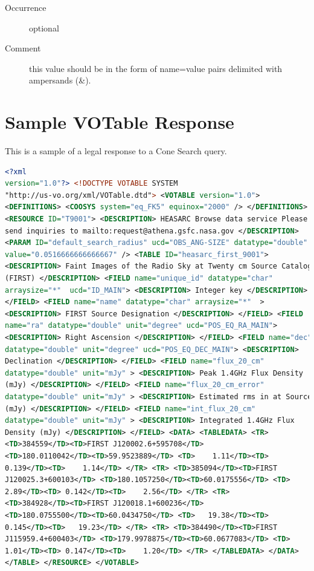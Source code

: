 \documentclass[11pt,a4paper]{ivoa} 
\begin{document}
\begin{generated}
\begin{bigdescription}
\begin{description}
\item[Occurrence] optional \item[Comment] this value should be in the
form of name=value pairs delimited with ampersands (\&).  
               

\end{description}


\end{bigdescription}\endgroup

\endgroup \end{generated}


\appendix \section{Sample VOTable Response} \label{app:responsesample}
This is a sample of a legal response to a Cone Search query.

\begin{lstlisting}[language=XML,basicstyle=\footnotesize] <?xml
version="1.0"?> <!DOCTYPE VOTABLE SYSTEM
"http://us-vo.org/xml/VOTable.dtd"> <VOTABLE version="1.0">
<DEFINITIONS> <COOSYS system="eq_FK5" equinox="2000" /> </DEFINITIONS>
<RESOURCE ID="T9001"> <DESCRIPTION> HEASARC Browse data service Please
send inquiries to mailto:request@athena.gsfc.nasa.gov </DESCRIPTION>
<PARAM ID="default_search_radius" ucd="OBS_ANG-SIZE" datatype="double"
value="0.0516666666666667" /> <TABLE ID="heasarc_first_9001">
<DESCRIPTION> Faint Images of the Radio Sky at Twenty cm Source Catalog
(FIRST) </DESCRIPTION> <FIELD name="unique_id" datatype="char"
arraysize="*"  ucd="ID_MAIN"> <DESCRIPTION> Integer key </DESCRIPTION>
</FIELD> <FIELD name="name" datatype="char" arraysize="*"  >
<DESCRIPTION> FIRST Source Designation </DESCRIPTION> </FIELD> <FIELD
name="ra" datatype="double" unit="degree" ucd="POS_EQ_RA_MAIN">
<DESCRIPTION> Right Ascension </DESCRIPTION> </FIELD> <FIELD name="dec"
datatype="double" unit="degree" ucd="POS_EQ_DEC_MAIN"> <DESCRIPTION>
Declination </DESCRIPTION> </FIELD> <FIELD name="flux_20_cm"
datatype="double" unit="mJy" > <DESCRIPTION> Peak 1.4GHz Flux Density
(mJy) </DESCRIPTION> </FIELD> <FIELD name="flux_20_cm_error"
datatype="double" unit="mJy" > <DESCRIPTION> Estimated rms in at Source
(mJy) </DESCRIPTION> </FIELD> <FIELD name="int_flux_20_cm"
datatype="double" unit="mJy" > <DESCRIPTION> Integrated 1.4GHz Flux
Density (mJy) </DESCRIPTION> </FIELD> <DATA> <TABLEDATA> <TR>
<TD>384559</TD><TD>FIRST J120002.6+595708</TD>
<TD>180.0110042</TD><TD>59.9523889</TD> <TD>    1.11</TD><TD>
0.139</TD><TD>    1.14</TD> </TR> <TR> <TD>385094</TD><TD>FIRST
J120025.3+600103</TD> <TD>180.1057250</TD><TD>60.0175556</TD> <TD>
2.89</TD><TD> 0.142</TD><TD>    2.56</TD> </TR> <TR>
<TD>384928</TD><TD>FIRST J120018.1+600236</TD>
<TD>180.0755500</TD><TD>60.0434750</TD> <TD>   19.38</TD><TD>
0.145</TD><TD>   19.23</TD> </TR> <TR> <TD>384490</TD><TD>FIRST
J115959.4+600403</TD> <TD>179.9978875</TD><TD>60.0677083</TD> <TD>
1.01</TD><TD> 0.147</TD><TD>    1.20</TD> </TR> </TABLEDATA> </DATA>
</TABLE> </RESOURCE> </VOTABLE> \end{lstlisting}
\end{document}
